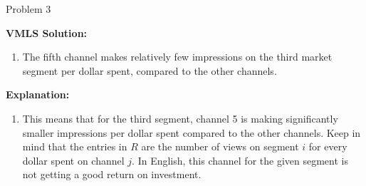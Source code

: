 \begin{problem}{Problem 3}
\begin{Highlight}
        \noindent \textbf{VMLS Solution:}

        \begin{enumerate}[label = (\alph*), start = 5]
            \item The fifth channel makes relatively few impressions on the third market segment per dollar spent, compared to the other channels.
        \end{enumerate}

        \noindent \textbf{Explanation:}

        \begin{enumerate}[label = (\alph*), start = 5]
            \item This means that for the third segment, channel 5 is making significantly smaller impressions per dollar spent compared to the other channels. Keep in mind that the entries in $R$ are
            the number of views on segment $i$ for every dollar spent on channel $j$. In English, this channel for the given segment is not getting a good return on investment.
        \end{enumerate}
    \end{Highlight}
\end{problem}

